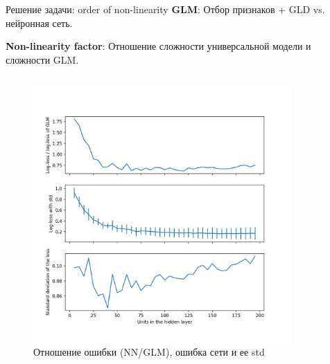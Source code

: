 \documentclass{beamer}
\begin{document}
\begin{frame}{Решение задачи: order of non-linearity}
    \textbf{GLM}: Отбор признаков  + GLD vs. нейронная сеть.

    \textbf{Non-linearity factor}: Отношение сложности универсальной модели и сложности GLM.
    \begin{columns} %
        \begin{column}{.5\textwidth}
            \begin{figure}[ht]
                \centering
                  \includegraphics[width=\textwidth]{../pics/loss_and_std_of_n_units_reg.png}
                  \caption{Отношение ошибки (NN/GLM), ошибка сети и ее std}
            \end{figure}
        \end{column}%
        \hfill
        \begin{column}{.5\textwidth}
            \begin{figure}[ht]
                \centering

\end{figure}
\end{column}
\end{columns}
\end{frame}
\end{document}

